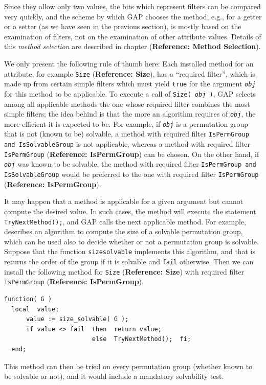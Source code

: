 \documentclass[a4paper,11pt]{report}
\begin{document}
{{ Since they allow only two values, the bits which represent filters can be
compared very quickly, and the scheme by which \textsf{GAP} chooses the method, e.g., for a getter or a setter (as we have seen in the
previous section), is mostly based on the examination of filters, not on the
examination of other attribute values. Details of this \emph{method selection} are described in chapter{\nobreakspace} (\textbf{Reference: Method Selection}). 

 We only present the following rule of thumb here: Each installed method for an
attribute, for example \texttt{Size} (\textbf{Reference: Size}), has a ``required filter'', which is made up from certain simple filters which must yield \texttt{true} for the argument \mbox{\texttt{\mdseries\slshape obj}} for this method to be applicable. To execute a call of \texttt{Size( \mbox{\texttt{\mdseries\slshape obj}} )}, \textsf{GAP} selects among all applicable methods the one whose required filter combines
the most simple filters; the idea behind is that the more an algorithm
requires of \mbox{\texttt{\mdseries\slshape obj}}, the more efficient it is expected to be. For example, if \mbox{\texttt{\mdseries\slshape obj}} is a permutation group that is not (known to be) solvable, a method with
required filter \texttt{IsPermGroup and IsSolvableGroup} is not applicable, whereas a method with required filter \texttt{IsPermGroup} (\textbf{Reference: IsPermGroup}) can be chosen. On the other hand, if \mbox{\texttt{\mdseries\slshape obj}} was known to be solvable, the method with required filter \texttt{IsPermGroup and IsSolvableGroup} would be preferred to the one with required filter \texttt{IsPermGroup} (\textbf{Reference: IsPermGroup}). 

 It may happen that a method is applicable for a given argument but cannot
compute the desired value. In such cases, the method will execute the
statement \texttt{TryNextMethod();},  and \textsf{GAP} calls the next applicable method. For example, \cite{Sims90b} describes an algorithm to compute the size of a solvable permutation group,
which can be used also to decide whether or not a permutation group is
solvable. Suppose that the function \texttt{size{\textunderscore}solvable} implements this algorithm, and that is returns the order of the group if it is
solvable and \texttt{fail} otherwise. Then we can install the following method for \texttt{Size} (\textbf{Reference: Size}) with required filter \texttt{IsPermGroup} (\textbf{Reference: IsPermGroup}). 
\begin{Verbatim}[commandchars=!@|,fontsize=\small,frame=single,label=Example]
  function( G )
  local  value;
      value := size_solvable( G );
      if value <> fail  then  return value;
                        else  TryNextMethod();  fi;
  end;
\end{Verbatim}
 This method can then be tried on every permutation group (whether known to be
solvable or not), and it would include a mandatory solvability test. 

}}
\end{document}
